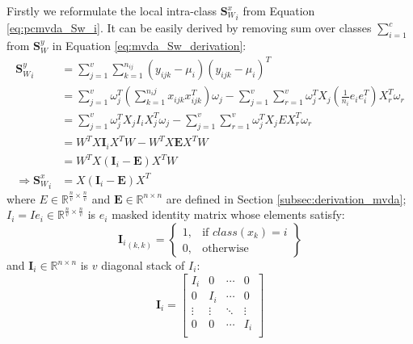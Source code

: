 \begin{appendix}
    Firstly we reformulate the local intra-class ${\boldsymbol{S}^x_W}_{i}$ from Equation \eqref{eq:pcmvda_Sw_i}.
    It can be easily derived by removing sum over classes $\sum_{i=1}^{c}$ from $\boldsymbol{S}_W^y$ in Equation \eqref{eq:mvda_Sw_derivation}:
    \begin{equation}
        \begin{split}
            {\boldsymbol{S}_W^y}_i &= \sum_{j=1}^{v}\sum_{k=1}^{n_{ij}}\left(y_{ijk}-\mu_i\right)\left(y_{ijk}-\mu_i\right)^T \\
            &= \sum_{j=1}^{v}\omega_j^T\left(\sum_{k=1}^{n_ij}x_{ijk}x_{ijk}^T\right)\omega_j - \sum_{j=1}^{v}\sum_{r=1}^{v}\omega_j^T X_j\left(\frac{1}{n_i} e_i e_i^T\right)X_r^T\omega_r \\
            &= \sum_{j=1}^{v}\omega_j^T X_j I_i X_j^T\omega_j - \sum_{j=1}^{v}\sum_{r=1}^{v}\omega_j^T X_j E X_r^T\omega_r \\
            &= W^T X \boldsymbol{I}_i X^T W - W^T X \boldsymbol{E} X^T W \\
            &= W^T X \left(\boldsymbol{I}_i - \boldsymbol{E}\right) X^T W \\
            \Rightarrow {\boldsymbol{S}_W^x}_i &= X \left(\boldsymbol{I}_i - \boldsymbol{E}\right) X^T
        \end{split}
        \label{eq:pcmvda_Sw_i_derivation}
    \end{equation}
    where $E \in \mathbb{R}^{\frac{n}{v}\times \frac{n}{v}}$ and $\boldsymbol{E} \in \mathbb{R}^{n\times n}$ are defined in Section \ref{subsec:derivation_mvda}; $I_{i} = I e_i \in \mathbb{R}^{\frac{n}{v}\times \frac{n}{v}}$ is $e_i$ masked identity matrix whose elements satisfy:
    \begin{equation}
        {\boldsymbol{I}_{i}}_{(k,k)} = \left\{\begin{array}{lr}
            1, & \text{if } class(x_k) = i \\
            0, & \text{otherwise}
            \end{array}\right\}
    \end{equation}
    and $\boldsymbol{I}_{i} \in \mathbb{R}^{n\times n}$ is $v$ diagonal stack of $I_i$:
    \begin{equation}
        \boldsymbol{I}_{i} = \left[\begin{matrix}I_i&0&\cdots&0\\0&I_i&\cdots&0\\\vdots&\vdots&\ddots&\vdots\\0&0&\cdots&I_i\\\end{matrix}\right]
    \end{equation}


\end{appendix}
